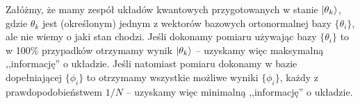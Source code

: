 \documentclass{myclass}
\begin{document}
Załóżmy, że mamy zespół układów kwantowych przygotowanych w stanie \(\ket{\theta_k}\), gdzie
\(\theta_k\) jest (określonym) jednym z wektorów bazowych ortonormalnej bazy \(\{\theta_i\}\), ale
nie wiemy o jaki stan chodzi. Jeśli dokonamy pomiaru używając bazy \(\{\theta_i\}\) to w 100\%
przypadków otrzymamy wynik \(\ket{\theta_k}\) -- uzyskamy więc maksymalną ,,informację'' o układzie.
Jeśli natomiast pomiaru dokonamy w bazie dopełniającej \(\{\phi_i\}\) to otrzymamy wszystkie możliwe
wyniki \(\{\phi_i\}\), każdy z prawdopodobieństwem \(1/N\) -- uzyskamy więc minimalną ,,informację''
o układzie.
\end{document}
